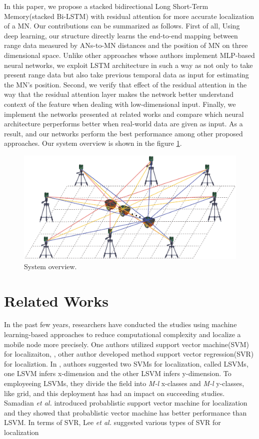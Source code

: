 \documentclass{ieeeaccess}
\begin{document}
In this paper, we propose a stacked bidirectional Long Short-Term Memory(stacked Bi-LSTM) with residual attention for more accurate localization of a MN. Our contributions can be summarized as follows. First of all, Using deep learning, our structure directly learns the end-to-end mapping between range data measured by ANs-to-MN distances and the position of MN on three dimensional space. Unlike other approaches whose authors implement MLP-based neural networks, we exploit LSTM architecture in such a way as not only to take present range data but also take previous temporal data as input for estimating the MN's position. Second, we verify that effect of the residual attention in the way that the residual attention layer makes the network better understand context of the feature when dealing with low-dimensional input. Finally, we implement the networks presented at related works and compare which neural architecture perperforms better when real-world data are given as input. As a result, and our networks perform the best performance among other proposed approaches. Our system overview is shown in the figure \ref{fig:system_overview}. 



\begin{figure}[h]
	\centering
	\includegraphics[width=.5\textwidth]{image/Access_overview_figure_1}
	\caption{System overview.}
	\label{fig:system_overview}
\end{figure}

\section{Related Works}

In the past few years, researchers have conducted the studies using machine learning-based approaches to reduce computational complexity and localize a mobile node more precisely. One authors utilized support vector machine(SVM) for localizaiton, \cite{tran2008localization, huan2010three, feng2012determination, afzal2014localization}, other author developed method support vector regression(SVR) for localiztion\cite{lee2013new, lee2013novel}. In \cite{tran2008localization}, authors suggested two SVMs for localization, called LSVMs, one LSVM infers x-dimension and the other LSVM infers y-dimension. To employeeing LSVMs, they divide the field into \textit{M-l} x-classes and \textit{M-l} y-classes, like grid, and this deployment has had an impact on succeeding studies\cite{chatterjee2010fletcher, feng2012determination, afzal2014localization}. Samadian \textit{et al.}\cite{samadian2011probabilistic} introduced probablistic support vector machine for localization and they showed that probablistic vector machine has better performance than LSVM. In terms of SVR, Lee \textit{et al.} suggested various types of SVR for localization\cite{lee2013new, lee2013novel}  
\end{document}
